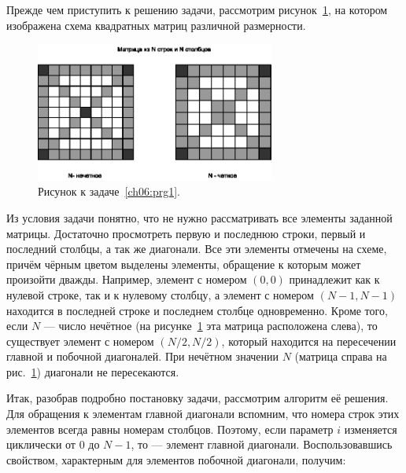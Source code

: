 
Прежде чем приступить к решению задачи, рассмотрим рисунок~\ref{ch06:refDrawing8}, на котором изображена схема квадратных
матриц различной размерности. 

\begin{figure}[htb]
\begin{center}
\includegraphics[width=0.7\textwidth]{img/ris_6_9}
\caption{Рисунок к задаче~\ref{ch06:prg1}.}
\label{ch06:refDrawing8}
\end{center}
\end{figure}

Из условия задачи понятно, что не нужно рассматривать все элементы заданной матрицы. Достаточно просмотреть первую и
последнюю строки, первый и последний столбцы, а так же диагонали. Все эти элементы отмечены на схеме, причём чёрным
цветом выделены элементы, обращение к которым может произойти дважды. Например, элемент с номером $(0,0)$ принадлежит как
к нулевой строке, так и к нулевому столбцу, а элемент с номером $(N-1,N-1)$
находится в последней строке и последнем столбце одновременно. Кроме того, если $N$ --- число нечётное 
(на рисунке~\ref{ch06:refDrawing8} эта матрица расположена слева), то существует элемент с номером $(N/2, N/2)$,
который находится на пересечении главной и побочной диагоналей. При нечётном значении $N$ (матрица справа на
рис.~\ref{ch06:refDrawing8}) диагонали не пересекаются.

Итак, разобрав подробно постановку задачи, рассмотрим алгоритм её решения. Для обращения к элементам главной диагонали
вспомним, что номера строк этих элементов всегда равны номерам столбцов. Поэтому, если параметр $i$ изменяется
циклически от 0 до $N-1$, то  --- элемент главной диагонали. Воспользовавшись
свойством, характерным для элементов побочной диагонали, получим:

